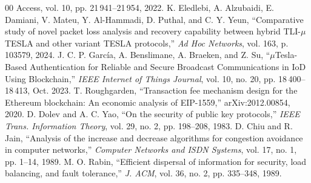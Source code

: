 \documentclass[conference]{IEEEtran}
\begin{document}
\begin{thebibliography}{00}
{Access}, vol. 10, pp. 21\,941--21\,954, 2022.
 K. Eledlebi, A. Alzubaidi, E. Damiani, V. Mateu, Y.
Al-Hammadi, D. Puthal, and C. Y. Yeun, ``Comparative study of novel packet loss
analysis and recovery capability between hybrid TLI-$\mu$TESLA and other variant
TESLA protocols,'' \emph{Ad Hoc Networks}, vol. 163, p. 103579, 2024.
 J. C. P. Garc\'ia, A. Benslimane, A. Braeken, and Z. Su,
``$\mu$Tesla-Based Authentication for Reliable and Secure Broadcast
Communications in IoD Using Blockchain,'' \emph{IEEE Internet of Things Journal},
vol. 10, no. 20, pp. 18\,400--18\,413, Oct. 2023.
 T. Roughgarden, ``Transaction fee mechanism design for the
Ethereum blockchain: An economic analysis of EIP-1559,'' arXiv:2012.00854, 2020.
 D. Dolev and A. C. Yao, ``On the security of public key
protocols,'' \emph{IEEE Trans. Information Theory}, vol. 29, no. 2, pp. 198--208,
1983.
 D. Chiu and R. Jain, ``Analysis of the increase and decrease
algorithms for congestion avoidance in computer networks,'' \emph{Computer
Networks and ISDN Systems}, vol. 17, no. 1, pp. 1--14, 1989.
 M. O. Rabin, ``Efficient dispersal of information for security,
load balancing, and fault tolerance,'' \emph{J. ACM}, vol. 36, no. 2, pp.
335--348, 1989.
\end{thebibliography}
\end{document}
